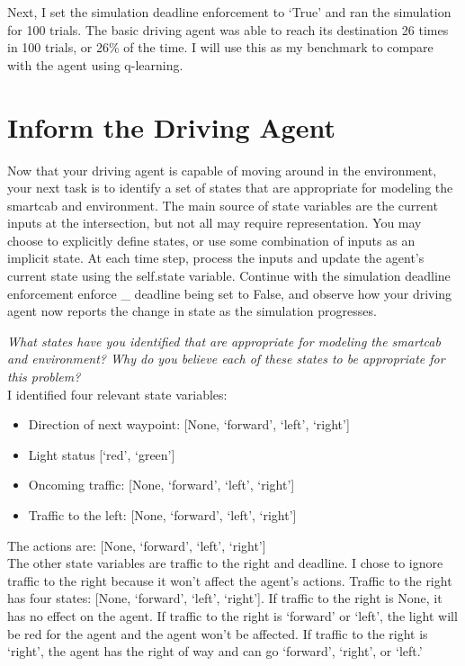\documentclass[11pt]{article}
\begin{document}
Next, I set the simulation deadline enforcement to ‘True’ and ran the simulation for 100 trials. The basic driving agent was able to reach its destination 26 times in 100 trials, or 26\% of the time. I will use this as my benchmark to compare with the agent using q-learning.

\section{Inform the Driving Agent}

Now that your driving agent is capable of moving around in the environment, your next task is to identify a set of states that are appropriate for modeling the smartcab and environment. The main source of state variables are the current inputs at the intersection, but not all may require representation. You may choose to explicitly define states, or use some combination of inputs as an implicit state. At each time step, process the inputs and update the agent's current state using the self.state variable. Continue with the simulation deadline enforcement enforce \_ deadline being set to False, and observe how your driving agent now reports the change in state as the simulation progresses.

\textit{What states have you identified that are appropriate for modeling the smartcab and environment? Why do you believe each of these states to be appropriate for this problem?}\\

I identified four relevant state variables:
\begin{itemize}
  \item Direction of next waypoint: [None, ‘forward’, ‘left’, ‘right’]
  \item Light status [‘red’, ‘green’]
  \item Oncoming traffic: [None, ‘forward’, ‘left’, ‘right’]
  \item Traffic to the left: [None, ‘forward’, ‘left’, ‘right’]
\end{itemize}

The actions are: [None, ‘forward’, ‘left’, ‘right’]\\

The other state variables are traffic to the right and deadline. I chose to ignore traffic to the right because it won’t affect the agent’s actions. Traffic to the right has four states: [None, ‘forward’, ‘left’, ‘right’]. If traffic to the right is None, it has no effect on the agent. If traffic to the right is ‘forward’ or ‘left', the light will be red for the agent and the agent won’t be affected. If traffic to the right is ‘right’, the agent has the right of way and can go ‘forward’, ‘right’, or ‘left.'\\
\end{document}
